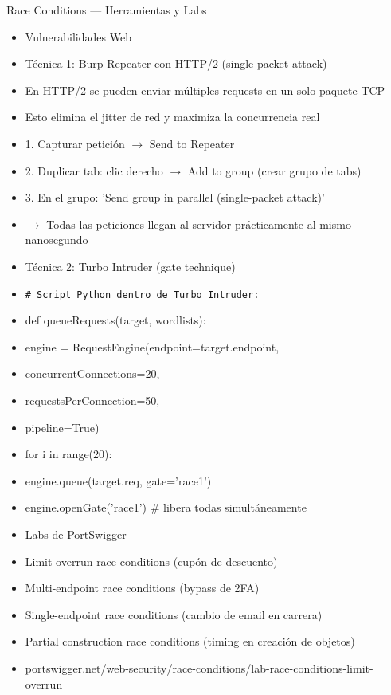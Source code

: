 \documentclass[aspectratio=169,10pt]{beamer}
\newcommand{\cmd}[1]{\texttt{\color{uznavy}#1}}
\begin{document}
\begin{frame}[allowframebreaks]{Race Conditions --- Herramientas y Labs}
\small
  \begin{itemize}
  \item Vulnerabilidades Web
  \item Técnica 1: Burp Repeater con HTTP/2 (single-packet attack)
  \item En HTTP/2 se pueden enviar múltiples requests en un solo paquete TCP
  \item Esto elimina el jitter de red y maximiza la concurrencia real
  \item 1. Capturar petición $\rightarrow$ Send to Repeater
  \item 2. Duplicar tab: clic derecho $\rightarrow$ Add to group (crear grupo de tabs)
  \item 3. En el grupo: 'Send group in parallel (single-packet attack)'
  \item $\rightarrow$ Todas las peticiones llegan al servidor prácticamente al mismo nanosegundo
  \item Técnica 2: Turbo Intruder (gate technique)
  \item \cmd{\# Script Python dentro de Turbo Intruder:}
  \item def queueRequests(target, wordlists):
  \item engine = RequestEngine(endpoint=target.endpoint,
  \item concurrentConnections=20,
  \item requestsPerConnection=50,
  \item pipeline=True)
  \item for i in range(20):
  \item engine.queue(target.req, gate='race1')
  \item engine.openGate('race1') \# libera todas simultáneamente
  \item Labs de PortSwigger
  \item Limit overrun race conditions (cupón de descuento)
  \item Multi-endpoint race conditions (bypass de 2FA)
  \item Single-endpoint race conditions (cambio de email en carrera)
  \item Partial construction race conditions (timing en creación de objetos)
  \item portswigger.net/web-security/race-conditions/lab-race-conditions-limit-overrun
  \end{itemize}
\end{frame}
\end{document}
